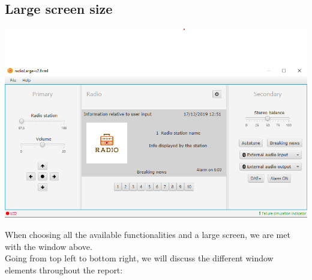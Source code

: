 \documentclass[11pt]{article}
\begin{document}
\subsection{Large screen size}
\vspace{10px}
\begin{center}
\includegraphics[width=15cm]{../Screenshots/radioLarge-v4.png}\\
\end{center}
When choosing all the available functionalities and a large screen, we are met with the window above.\\
Going from top left to bottom right, we will discuss the different window elements throughout the report:
\end{document}
